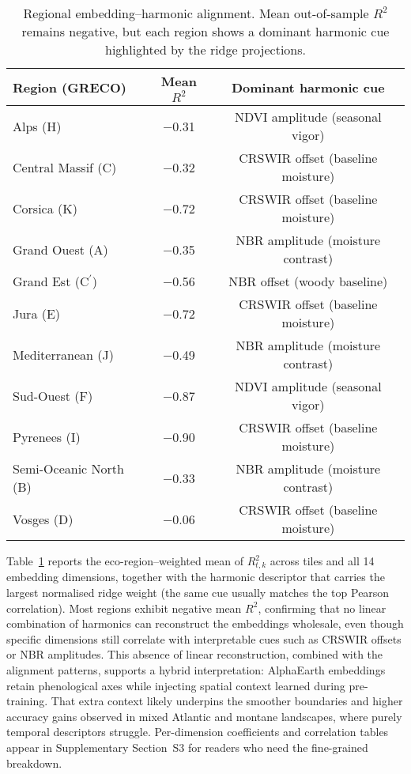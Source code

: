 \documentclass[utf8]{FrontiersinHarvard}
\begin{document}
\begin{table}[H]
    \centering
    \small
    \begin{tabular}{lcc}
        \toprule
        \textbf{Region (GRECO)} & \textbf{Mean $R^2$} & \textbf{Dominant harmonic cue} \\
        \midrule
        Alps (H) & −0.31 & NDVI amplitude (seasonal vigor) \\
        Central Massif (C) & −0.32 & CRSWIR offset (baseline moisture) \\
        Corsica (K) & −0.72 & CRSWIR offset (baseline moisture) \\
        Grand Ouest (A) & −0.35 & NBR amplitude (moisture contrast) \\
        Grand Est (C$^\prime$) & −0.56 & NBR offset (woody baseline) \\
        Jura (E) & −0.72 & CRSWIR offset (baseline moisture) \\
        Mediterranean (J) & −0.49 & NBR amplitude (moisture contrast) \\
        Sud-Ouest (F) & −0.87 & NDVI amplitude (seasonal vigor) \\
        Pyrenees (I) & −0.90 & CRSWIR offset (baseline moisture) \\
        Semi-Oceanic North (B) & −0.33 & NBR amplitude (moisture contrast) \\
        Vosges (D) & −0.06 & CRSWIR offset (baseline moisture) \\
        \bottomrule
    \end{tabular}
    \caption{Regional embedding–harmonic alignment. Mean out-of-sample \(R^2\) remains negative, but each region shows a dominant harmonic cue highlighted by the ridge projections.}
    \label{tab:similarity_summary}
\end{table}

Table~\ref{tab:similarity_summary} reports the eco-region–weighted mean of \(R^2_{t,k}\) across tiles and all 14 embedding dimensions, together with the harmonic descriptor that carries the largest normalised ridge weight (the same cue usually matches the top Pearson correlation). Most regions exhibit negative mean $R^2$, confirming that no linear combination of harmonics can reconstruct the embeddings wholesale, even though specific dimensions still correlate with interpretable cues such as CRSWIR offsets or NBR amplitudes. This absence of linear reconstruction, combined with the alignment patterns, supports a hybrid interpretation: AlphaEarth embeddings retain phenological axes while injecting spatial context learned during pre-training. That extra context likely underpins the smoother boundaries and higher accuracy gains observed in mixed Atlantic and montane landscapes, where purely temporal descriptors struggle. Per-dimension coefficients and correlation tables appear in Supplementary Section~S3 for readers who need the fine-grained breakdown.
\end{document}
